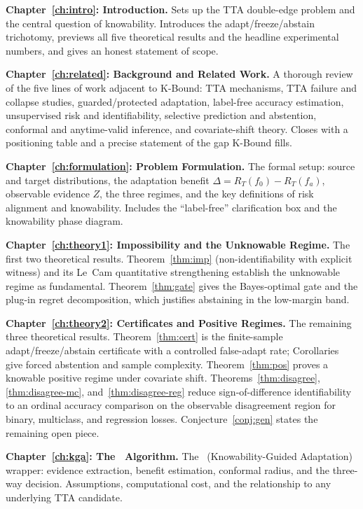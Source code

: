 \medskip
\noindent\textbf{Chapter~\ref{ch:intro}: Introduction.}
Sets up the TTA double-edge problem and the central question of knowability.
Introduces the adapt/freeze/abstain trichotomy, previews all five theoretical
results and the headline experimental numbers, and gives an honest statement of
scope.

\medskip
\noindent\textbf{Chapter~\ref{ch:related}: Background and Related Work.}
A thorough review of the five lines of work adjacent to K-Bound: TTA mechanisms,
TTA failure and collapse studies, guarded/protected adaptation, label-free
accuracy estimation, unsupervised risk and identifiability, selective prediction
and abstention, conformal and anytime-valid inference, and covariate-shift theory.
Closes with a positioning table and a precise statement of the gap K-Bound fills.

\medskip
\noindent\textbf{Chapter~\ref{ch:formulation}: Problem Formulation.}
The formal setup: source and target distributions, the adaptation benefit
$\Delta = R_T(f_0) - R_T(f_a)$, observable evidence $Z$, the three regimes, and
the key definitions of risk alignment and knowability.
Includes the ``label-free'' clarification box and the knowability phase diagram.

\medskip
\noindent\textbf{Chapter~\ref{ch:theory1}: Impossibility and the Unknowable Regime.}
The first two theoretical results.
Theorem~\ref{thm:imp} (non-identifiability with explicit witness) and its Le~Cam
quantitative strengthening establish the unknowable regime as fundamental.
Theorem~\ref{thm:gate} gives the Bayes-optimal gate and the plug-in regret
decomposition, which justifies abstaining in the low-margin band.

\medskip
\noindent\textbf{Chapter~\ref{ch:theory2}: Certificates and Positive Regimes.}
The remaining three theoretical results.
Theorem~\ref{thm:cert} is the finite-sample adapt/freeze/abstain certificate with
a controlled false-adapt rate; Corollaries give forced abstention and sample
complexity.
Theorem~\ref{thm:pos} proves a knowable positive regime under covariate shift.
Theorems~\ref{thm:disagree}, \ref{thm:disagree-mc}, and~\ref{thm:disagree-reg}
reduce sign-of-difference identifiability to an ordinal accuracy comparison on the
observable disagreement region for binary, multiclass, and regression losses.
Conjecture~\ref{conj:gen} states the remaining open piece.

\medskip
\noindent\textbf{Chapter~\ref{ch:kga}: The \KGA\ Algorithm.}
The \KGA\ (Knowability-Guided Adaptation) wrapper: evidence extraction,
benefit estimation, conformal radius, and the three-way decision.
Assumptions, computational cost, and the relationship to any underlying TTA
candidate.

